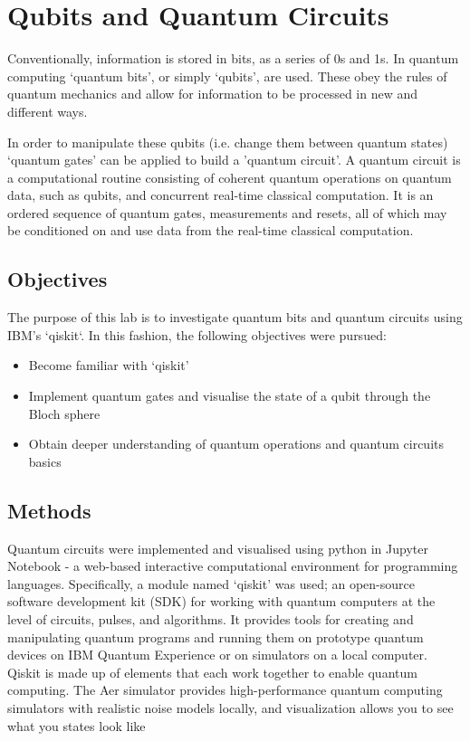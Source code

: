 \renewcommand{\chaptername}{March 8th: Lab}
\chapter{Qubits and Quantum Circuits}

Conventionally, information is stored in bits, as a series of 0s and 1s. In quantum computing `quantum bits', or simply `qubits', are used. These obey the rules of quantum mechanics and allow for information to be processed in new and different ways.

In order to manipulate these qubits (i.e. change them between quantum states) `quantum gates' can be applied to build a 'quantum circuit'. A quantum circuit is a computational routine consisting of coherent quantum operations on quantum data, such as qubits, and concurrent real-time classical computation. It is an ordered sequence of quantum gates, measurements and resets, all of which may be conditioned on and use data from the real-time classical computation.

\section{Objectives}
The purpose of this lab is to investigate quantum bits and quantum circuits using IBM's `qiskit`. In this fashion, the following objectives were pursued:
\begin{itemize}
    \item Become familiar with `qiskit'
    \item Implement quantum gates and visualise the state of a qubit through the Bloch sphere
    \item Obtain deeper understanding of quantum operations and quantum circuits basics
\end{itemize}

\section{Methods}
Quantum circuits were implemented and visualised using python in Jupyter Notebook - a web-based interactive computational environment for programming languages. Specifically, a module named `qiskit' was used; an open-source software development kit (SDK) for working with quantum computers at the level of circuits, pulses, and algorithms. It provides tools for creating and manipulating quantum programs and running them on prototype quantum devices on IBM Quantum Experience or on simulators on a local computer. Qiskit is made up of elements that each work together to enable quantum computing. The Aer simulator provides high-performance quantum computing simulators with realistic noise models locally, and visualization allows you to see what you states look like

